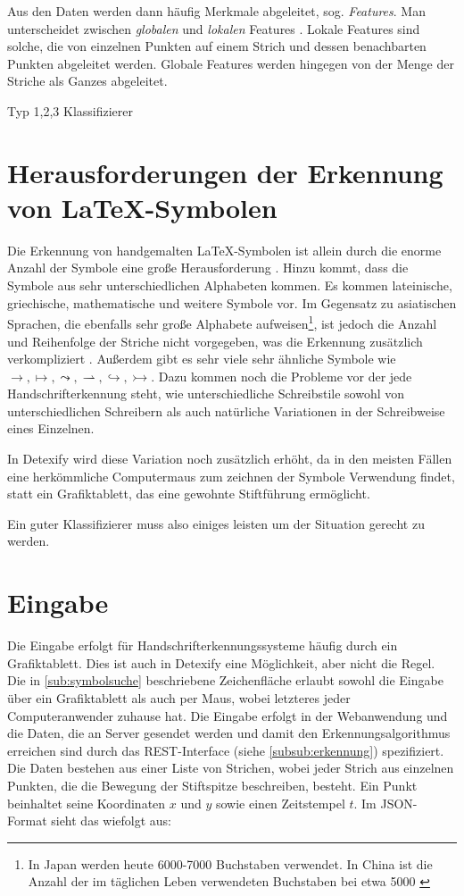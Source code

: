 Aus den Daten werden dann häufig Merkmale abgeleitet, sog. \emph{Features}. Man unterscheidet zwischen \emph{globalen} und \emph{lokalen} Features \cite{Tapia:2007p9160}. Lokale Features sind solche, die von einzelnen Punkten auf einem Strich und dessen benachbarten Punkten abgeleitet werden. Globale Features werden hingegen von der Menge der Striche als Ganzes abgeleitet.

\TODO Typ 1,2,3 Klassifizierer

\section[Herausforderungen]{Herausforderungen der Erkennung von \LaTeX-Symbolen} Die Erkennung von handgemalten \LaTeX-Symbolen ist allein durch die enorme Anzahl der Symbole eine große Herausforderung \cite{Koerich:2003p1562}. Hinzu kommt, dass die Symbole aus sehr unterschiedlichen Alphabeten kommen. Es kommen lateinische, griechische, mathematische und weitere Symbole vor. Im Gegensatz zu asiatischen Sprachen, die ebenfalls sehr große Alphabete aufweisen\footnote{In Japan werden heute 6000-7000 Buchstaben verwendet. In China ist die Anzahl der im täglichen Leben verwendeten Buchstaben bei etwa 5000 \cite{Jaeger:2003p1097}}, ist jedoch die Anzahl und Reihenfolge der Striche nicht vorgegeben, was die Erkennung zusätzlich verkompliziert \cite{Watt:2005p1816}. Außerdem gibt es sehr viele sehr ähnliche Symbole wie $\rightarrow,\mapsto,\leadsto,\rightharpoonup,\hookrightarrow,\rightarrowtail$. Dazu kommen noch die Probleme vor der jede Handschrifterkennung steht, wie unterschiedliche Schreibstile sowohl von unterschiedlichen Schreibern als auch natürliche Variationen in der Schreibweise eines Einzelnen.

In Detexify wird diese Variation noch zusätzlich erhöht, da in den meisten Fällen eine herkömmliche Computermaus zum zeichnen der Symbole Verwendung findet, statt ein Grafiktablett, das eine gewohnte Stiftführung ermöglicht.

Ein guter Klassifizierer muss also einiges leisten um der Situation gerecht zu werden.

\section{Eingabe} \label{sec:input}

Die Eingabe erfolgt für Handschrifterkennungssysteme häufig durch ein Grafiktablett. Dies ist auch in Detexify eine Möglichkeit, aber nicht die Regel. Die in \ref{sub:symbolsuche} beschriebene Zeichenfläche erlaubt sowohl die Eingabe über ein Grafiktablett als auch per Maus, wobei letzteres jeder Computeranwender zuhause hat. Die Eingabe erfolgt in der Webanwendung und die Daten, die an Server gesendet werden und damit den Erkennungsalgorithmus erreichen sind durch das \ac{REST}-Interface (siehe \ref{subsub:erkennung}) spezifiziert. Die Daten bestehen aus einer Liste von Strichen, wobei jeder Strich aus einzelnen Punkten, die die Bewegung der Stiftspitze beschreiben, besteht. Ein Punkt beinhaltet seine Koordinaten $x$ und $y$ sowie einen Zeitstempel $t$. Im \ac{JSON}-Format sieht das wiefolgt aus:

